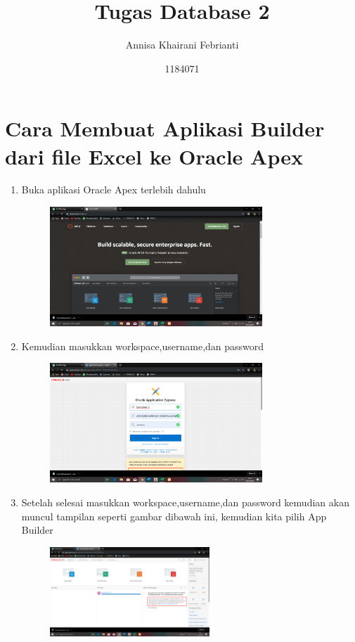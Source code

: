 \documentclass{article}
\title{Tugas Database 2}
\author{Annisa Khairani Febrianti}
\date{1184071}
\begin{document}
\maketitle

\section{Cara Membuat Aplikasi Builder dari file Excel ke Oracle Apex}
\begin{enumerate}
    \item Buka aplikasi Oracle Apex terlebih dahulu
         \begin{figure}[h]
            \centerline{\includegraphics[width=8cm]{image/1.png}}
            \end{figure}
    \newpage \item Kemudian masukkan workspace,username,dan password
         \begin{figure}[h]
    \centerline{\includegraphics[width=8cm]{image/2.png}}
    \end{figure}
    \item Setelah selesai masukkan workspace,username,dan password kemudian akan muncul tampilan seperti gambar dibawah ini, kemudian kita pilih App Builder
         \begin{figure}[h]
            \centerline{\includegraphics[width=6cm]{image/3.png}}

\end{figure}
\end{enumerate}
\end{document}
